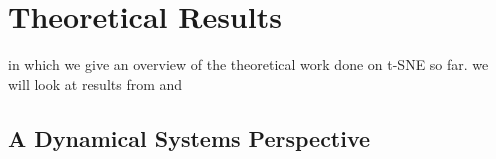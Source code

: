 \chapter{Theoretical Results}\label{chapter:theoretical_results}
in which we give an overview of the theoretical work done on t-SNE so far. 
we will look at results from \cite{JMLR:v23:21-0524} and \cite{LinStei22}

\section{A Dynamical Systems Perspective}